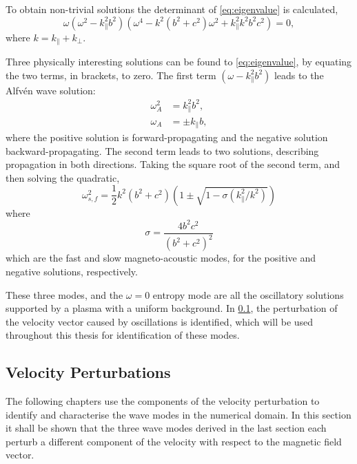 To obtain non-trivial solutions the determinant of \cref{eq:eigenvalue} is calculated,
\begin{equation}
    \omega(\omega^2 - k_\parallel^2 b^2)\left( \omega^4 - k^2(b^2+c^2)\omega^2 + k^2_\parallel k^2b^2c^2 \right) = 0,
\end{equation}
where $k = k_\parallel + k_\perp$.

Three physically interesting solutions can be found to \cref{eq:eigenvalue}, by equating the two terms, in brackets, to zero.
The first term $(\omega - k_\parallel^2 b^2)$ leads to the Alfv\'en wave solution:
\begin{align}
\omega^2_A &= k^2_\parallel b^2,\\
\omega_A &= \pm k_\parallel b,
\label{eq:omegaA}
\end{align}
where the positive solution is forward-propagating and the negative solution backward-propagating.
The second term leads to two solutions, describing propagation in both directions. 
Taking the square root of the second term, and then solving the quadratic,
\begin{equation}
    \omega^2_{s,f} = \frac{1}{2}k^2(b^2+c^2)\left(1 \pm \sqrt{1 - \sigma (k^2_\parallel/k^2)}\right)
    \label{eq:omegasf}
\end{equation}
where
\begin{equation}
    \sigma=\frac{4b^2c^2}{(b^2 + c^2)^2}
    \label{eq:sigmasf}
\end{equation}
which are the fast and slow magneto-acoustic modes, for the positive and negative solutions, respectively.

These three modes, and the $\omega = 0$ entropy mode are all the oscillatory solutions supported by a plasma with a uniform background.
In \cref{sec:Vpert}, the perturbation of the velocity vector caused by oscillations is identified, which will be used throughout this thesis for identification of these modes.


\subsection{Velocity Perturbations}\label{sec:Vpert}

The following chapters use the components of the velocity perturbation to identify and characterise the wave modes in the numerical domain.
In this section it shall be shown that the three wave modes derived in the last section each perturb a different component of the velocity with respect to the magnetic field vector.

